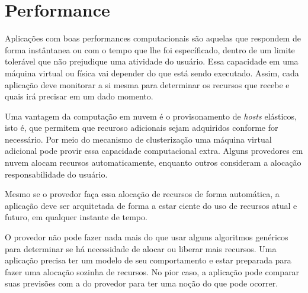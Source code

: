\section{Performance}

Aplicações com boas performances computacionais são aquelas que respondem de forma instântanea ou com o tempo que lhe foi específicado, dentro de um limite tolerável que não prejudique uma atividade do usuário. Essa capacidade em uma máquina virtual ou física vai depender do que está sendo executado. Assim, cada aplicação deve monitorar a si mesma para determinar os recursos que recebe e quais irá precisar em um dado momento.

Uma vantagem da computação em nuvem é o provisonamento de \textit{hosts} elásticos, isto é, que permitem que recuroso adicionais sejam adquiridos conforme for necessário. Por meio do mecanismo de clusterização uma máquina virtual adicional pode provir essa capacidade computacional extra. Alguns provedores em nuvem alocam recursos automaticamente, enquanto outros consideram a alocação responsabilidade do usuário.

Mesmo se o provedor faça essa alocação de recursos de forma automática, a aplicação deve ser arquitetada de forma a estar ciente do uso de recursos atual e futuro, em qualquer instante de tempo. 

O provedor não pode fazer nada mais do que usar alguns algoritmos genéricos para determinar se há necessidade de alocar ou liberar mais recursos. Uma aplicação precisa ter um modelo de seu comportamento e estar preparada para fazer uma alocação sozinha de recursos. No pior caso, a aplicação pode comparar suas previsões com a do provedor para ter uma noção do que pode ocorrer.

\iffalse

\section{Segurança}
\fi